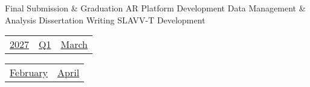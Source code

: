\vfill{\centering{} \small{Final Submission \& Graduation}\hspace{1.5em} \small{AR Platform Development}\hspace{1.5em} \small{Data Management \& Analysis}\hspace{1.5em} \small{Dissertation Writing}\hspace{1.5em} \small{SLAVV-T Development}\hspace{1.5em}\par}

\pagebreak
{\noindent\Large\renewcommand{\arraystretch}{\myNumArrayStretch}\begin{tabular}{|l|l|l}
\hyperlink{2027}{2027} & \hyperlink{Q1}{Q1} & \hyperlink{March}{March}
\end{tabular}\hfill%
\begin{tabular}{r|r@{}}
\hyperlink{month-2027-2}{February} & \hyperlink{month-2027-4}{April}
\end{tabular}}
\myLineThick
